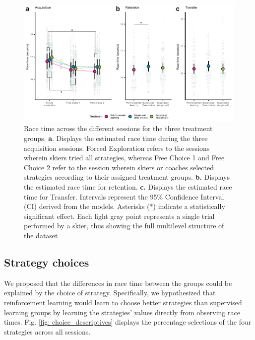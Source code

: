 \documentclass[pdflatex,sn-mathphys-num]{sn-jnl}%
\theoremstyle{thmstyleone}%
\theoremstyle{thmstyletwo}%
\theoremstyle{thmstylethree}%
\begin{document}
\begin{figure}[H]
\centering
\includegraphics{figures/figure_racingtimes_2.pdf}
\caption{Race time across the different sessions for the three treatment groups. \textbf{a}. Displays the estimated race time during the three acquisition sessions. Forced Exploration refers to the sessions wherein skiers tried all strategies, whereas Free Choice 1 and Free Choice 2 refer to the session wherein skiers or coaches selected strategies according to their assigned treatment groups. \textbf{b.} Displays the estimated race time for retention. \textbf{c.} Displays the estimated race time for Transfer. Intervals represent the 95\% Confidence Interval (CI) derived from the models. Asterisks (*) indicate a statistically significant effect. Each light gray point represents a single trial performed by a skier, thus showing the full multilevel structure of the dataset}
\label{fig: racetime}
\end{figure}


\subsection{Strategy choices}\label{result_strategychoice}
We proposed that the differences in race time between the groups could be explained by the choice of strategy. Specifically, we hypothesized that reinforcement learning would learn to choose better strategies than supervised learning groups by learning the strategies' values directly from observing race times. Fig. \ref{fig: choice_descriptives} displays the percentage selections of the four strategies across all sessions.
\end{document}
